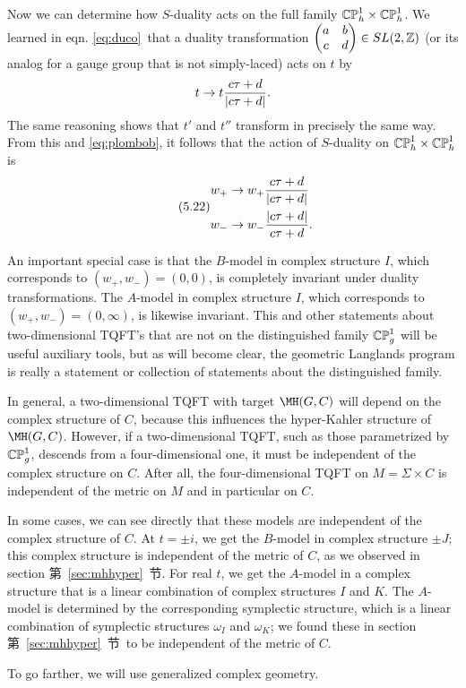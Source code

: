 Now we can determine how $S$-duality acts on the full family
$\Bbb{CP}^1_h\times \Bbb{CP}^1_h$.  We learned in eqn. \eqref{eq:duco}\ that
a duality transformation $\left(\begin{matrix}a & b \\ c & d\end{matrix}\right)\in
SL(2,\Bbb{Z})$ (or its analog for a gauge group that is not simply-laced)
acts on $t$ by %
\setcounter{equation}{20}
\begin{equation}\label{eq:utlo}
t\to t{c\tau+d\over
|c\tau+d|}.
\end{equation}
  The same reasoning shows that $t'$ and $t''$
transform in precisely the same way.  {}From this and \eqref{eq:plombob}, it
follows that the action of $S$-duality on $\Bbb{CP}^1_h\times
\Bbb{CP}^1_h$ is %
\begin{equation*}
\tag*{(5.22)}
\begin{aligned}w_+ & \to w_+{c \tau+d\over
|c\tau+d|}\\
                   w_-  & \to w_-{|c\tau+d|\over c
                   \tau+d}.\\\end{aligned}
\end{equation*}

An important special case is that the $B$-model in complex
structure $I$, which corresponds to $(w_+,w_-)=(0,0)$, is
completely invariant under duality transformations. The $A$-model
in complex structure $I$, which corresponds to
$(w_+,w_-)=(0,\infty)$, is likewise invariant. This and other
statements about two-dimensional TQFT's that are not on the
distinguished family $\Bbb{CP}^1_g$ will be useful auxiliary
tools, but as will become clear, the geometric Langlands program
is really a statement or collection of statements about the
distinguished family.

\par{}

In general, a two-dimensional TQFT with target $\MH(G,C)$ will
depend on the complex structure of $C$, because this influences
the hyper-Kahler structure of $\MH(G,C)$.  However, if a
two-dimensional TQFT, such as those parametrized by
$\Bbb{CP}^1_g$,  descends from a four-dimensional one, it must be
independent of the complex structure on $C$.  After all, the
four-dimensional TQFT on $M=\Sigma\times C$ is independent of the
metric on $M$ and in particular on $C$.

In some cases, we can see directly that these models are
independent of the complex structure of $C$.   At $t=\pm i$, we
get the $B$-model in complex structure $\pm J$; this complex
structure is independent of the metric of $C$, as we observed in
section 第~\ref{sec:mhhyper}~节. For real $t$, we get the $A$-model in a complex
structure that is a linear combination of complex structures $I$
and $K$. The $A$-model is determined by the corresponding
symplectic structure, which is a linear combination of symplectic
structures $\omega_I$ and $\omega_K$; we  found these in section
第~\ref{sec:mhhyper}~节\ to be independent of the metric of $C$.

To go farther, we will use generalized complex geometry.
